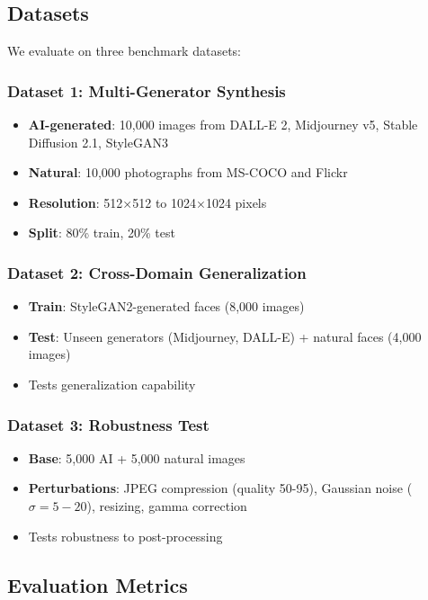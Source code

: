 \documentclass[runningheads]{llncs}
\begin{document}
\subsection{Datasets}

We evaluate on three benchmark datasets:

\subsubsection{Dataset 1: Multi-Generator Synthesis}
\begin{itemize}
    \item \textbf{AI-generated}: 10,000 images from DALL-E 2, Midjourney v5, Stable Diffusion 2.1, StyleGAN3
    \item \textbf{Natural}: 10,000 photographs from MS-COCO and Flickr
    \item \textbf{Resolution}: 512×512 to 1024×1024 pixels
    \item \textbf{Split}: 80\% train, 20\% test
\end{itemize}

\subsubsection{Dataset 2: Cross-Domain Generalization}
\begin{itemize}
    \item \textbf{Train}: StyleGAN2-generated faces (8,000 images)
    \item \textbf{Test}: Unseen generators (Midjourney, DALL-E) + natural faces (4,000 images)
    \item Tests generalization capability
\end{itemize}

\subsubsection{Dataset 3: Robustness Test}
\begin{itemize}
    \item \textbf{Base}: 5,000 AI + 5,000 natural images
    \item \textbf{Perturbations}: JPEG compression (quality 50-95), Gaussian noise ($\sigma=5-20$), resizing, gamma correction
    \item Tests robustness to post-processing
\end{itemize}

\subsection{Evaluation Metrics}
\end{document}
